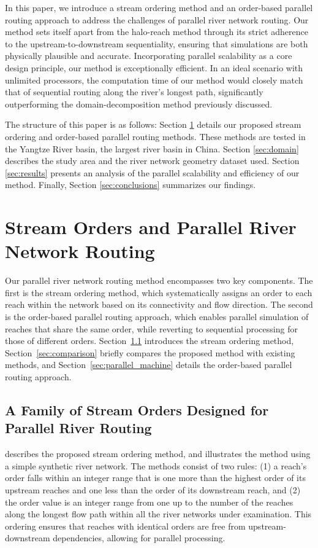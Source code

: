 \documentclass[water,article,submit,pdftex,moreauthors]{Definitions/mdpi}
\begin{document}
In this paper, we introduce a stream ordering method and an order-based parallel routing approach to address the challenges of parallel river network routing. Our method sets itself apart from the halo-reach method through its strict adherence to the upstream-to-downstream sequentiality, ensuring that simulations are both physically plausible and accurate. Incorporating parallel scalability as a core design principle, our method is exceptionally efficient. In an ideal scenario with unlimited processors, the computation time of our method would closely match that of sequential routing along the river's longest path, significantly outperforming the domain-decomposition method previously discussed.

The structure of this paper is as follows: Section \ref{sec:methods} details our proposed stream ordering and order-based parallel routing methods. These methods are tested in the Yangtze River basin, the largest river basin in China. Section \ref{sec:domain} describes the study area and the river network geometry dataset used. Section \ref{sec:results} presents an analysis of the parallel scalability and efficiency of our method. Finally, Section \ref{sec:conclusions} summarizes our findings.

\section{Stream Orders and Parallel River Network Routing}
\label{sec:methods}

Our parallel river network routing method encompasses two key components. The first is the stream ordering method, which systematically assigns an order to each reach within the network based on its connectivity and flow direction. The second is the order-based parallel routing approach, which enables parallel simulation of reaches that share the same order, while reverting to sequential processing for those of different orders. Section~\ref{sec:stream_order} introduces the stream ordering method, Section~\ref{sec:comparison} briefly compares the proposed method with existing methods, and Section~\ref{sec:parallel_machine} details the order-based parallel routing approach.

\subsection{A Family of Stream Orders Designed for Parallel River Routing}
\label{sec:stream_order}

 describes the proposed stream ordering method, and  illustrates the method using a simple synthetic river network. The methods consist of two rules: (1) a reach's order falls within an integer range that is one more than the highest order of its upstream reaches and one less than the order of its downstream reach, and (2) the order value is an integer range from one up to the number of the reaches along the longest flow path within all the river networks under examination. This ordering ensures that reaches with identical orders are free from upstream-downstream dependencies, allowing for parallel processing.
\end{document}
